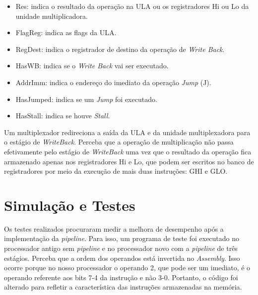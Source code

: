 \documentclass[11pt,a4paper,titlepage]{article}
\begin{document}
\begin{itemize}
\item Res: indica o resultado da operação na ULA ou os registradores Hi ou Lo da unidade multiplicadora.
\item FlagReg: indica as flags da ULA.
\item RegDest: indica o registrador de destino da operação de \textit{Write Back}.
\item HasWB: indica se o \textit{Write Back} vai ser executado.
\item AddrImm: indica o endereço do imediato da operação \textit{Jump} (J).
\item HasJumped: indica se um \textit{Jump} foi executado.
\item HasStall: indica se houve \textit{Stall}.
\end{itemize}

Um multiplexador redireciona a saída da ULA e da unidade multiplexadora para o estágio de 
\textit{WriteBack}. Perceba que a operação de multiplicação não passa efetivamente pelo estágio de 
\textit{WriteBack} uma vez que o resultado da operação fica armazenado apenas nos registradores Hi
e Lo, que podem ser escritos no banco de registradores por meio da execução de mais duas 
instruções: GHI e GLO.

\section{Simulação e Testes}

Os testes realizados procuraram medir a melhora de desempenho após a implementação da \textit{pipeline}.
Para isso, um programa de teste foi executado no processador antigo sem \textit{pipeline} e no processador
novo com a \textit{pipeline} de três estágios. Perceba que a ordem dos operandos está invertida no
\textit{Assembly}. Isso ocorre porque no nosso processador o operando 2, que pode ser um imediato, é o
operando referente aos bits 7-4 da instrução e não 3-0. Portanto, o código foi alterado para refletir
a característica das instruções armazenadas na memória.
\end{document}
